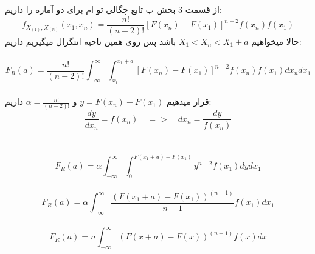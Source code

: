 \problem{}
از قسمت 3 بخش ب تابع چگالی تو ام برای دو آماره را داریم:\\
\[
    f_{X_{(1)},X_{(n)}}(x_1,x_n) = \frac{n!}{(n-2)!}
    [F(x_n)-F(x_1)]^{n-2}
    f(x_n)f(x_1)
\]
حالا میخواهیم $X_1<X_n<X_1+a$ باشد پس روی همین ناحیه انتگرال میگیریم
داریم:\\\\
\[
    F_R(a) = \frac{n!}{(n-2)!}\int_{-\infty}^{\infty}{
        \int_{x_1}^{x_1+a}{[F(x_n)-F(x_1)]^{n-2}
        f(x_n)f(x_1)}
        dx_n
    }dx_1
\]\\
قرار میدهیم $y = F(x_n) - F(x_1)$
و $\alpha = \frac{n!}{(n-2)!}$ داریم:\\

\[
  \frac{dy}{dx_n} = f(x_n) 
  \quad
  =>
  \quad 
  dx_n = \frac{dy}{f(x_n)}
\]\\\\

\[
    F_R(a) = \alpha\int_{-\infty}^{\infty}{
        \int_{0}^{F(x_1+a)-F(x_1)}{y^{n-2}}f(x_1)
        dy
    }dx_1
\]\\
\[
    F_R(a) = \alpha\int_{-\infty}^{\infty}{
    \frac{(F(x_1+a)-F(x_1))^{(n-1)}}{n-1}
    f(x_1)
    }dx_1
\]\\
\[
    F_R(a) = n\int_{-\infty}^{\infty}{
    (F(x+a)-F(x))^{(n-1)}
    f(x)
    }dx
\]
